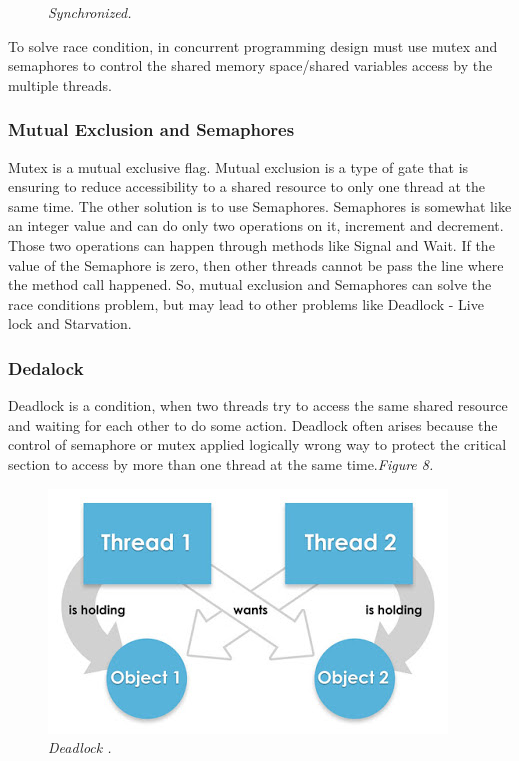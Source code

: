 \documentclass[12pt]{article}
\begin{document}
\begin{figure}[h!]
\begin{minipage}[h!]{0.4\textwidth}
    \caption{\textit{\color{gray}Synchronized\cite{Florian}.}}
  \end{minipage}
\end{figure}

To solve race condition, in concurrent programming design must use mutex and semaphores to control the shared memory space/shared variables access by the multiple threads.

	\subsubsection{Mutual Exclusion and Semaphores}
Mutex is a mutual exclusive flag. Mutual exclusion is a type of gate that is ensuring to reduce accessibility to a shared resource to only one thread at the same time. The other solution is to use Semaphores. Semaphores is somewhat like an integer value and can do only two operations on it, increment and decrement. Those two operations can happen through methods like Signal and Wait. If the value of the Semaphore is zero, then other threads cannot be pass the line where the method call happened.\citep{Nick&Julie}
So, mutual exclusion and Semaphores can solve the race conditions problem, but may lead to other problems like Deadlock - Live lock and Starvation.

	\subsubsection{Dedalock}
Deadlock is a condition, when two threads try to access the same shared resource and waiting for each other to do some action. Deadlock often arises because the control of semaphore or mutex applied logically wrong way to protect the critical section to access by more than one thread at the same time.\textit{\color{gray}Figure 8.}

\begin{figure}[h!]
\centering
\includegraphics[scale=0.5]{Pictures/deadlock.png}
\caption{\textit{\color{gray}Deadlock \cite{Paul}.}}
\end{figure}
\end{document}
